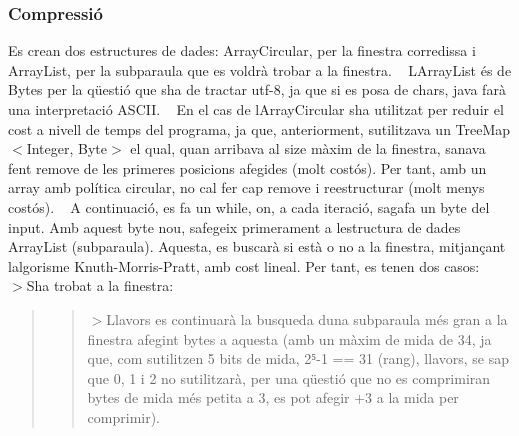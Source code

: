 \subsubsection*{Compressió}

Es crean dos estructures de dades\+: Array\+Circular, per la finestra corredissa i Array\+List, per la subparaula que es voldrà trobar a la finestra. ~\newline
 L\textquotesingle{}Array\+List és de Bytes per la qüestió que s\textquotesingle{}ha de tractar utf-\/8, ja que si es posa de char\textquotesingle{}s, java farà una interpretació A\+S\+C\+II. ~\newline
 En el cas de l\textquotesingle{}Array\+Circular s\textquotesingle{}ha utilitzat per reduir el cost a nivell de temps del programa, ja que, anteriorment, s\textquotesingle{}utilitzava un Tree\+Map$<$Integer, Byte$>$ el qual, quan arribava al size màxim de la finestra, s\textquotesingle{}anava fent remove de les primeres posicions afegides (molt costós). Per tant, amb un array amb política circular, no cal fer cap remove i reestructurar (molt menys costós). ~\newline
 A continuació, es fa un while, on, a cada iteració, s\textquotesingle{}agafa un byte del input. Amb aquest byte nou, s\textquotesingle{}afegeix primerament a l\textquotesingle{}estructura de dades Array\+List (subparaula). Aquesta, es buscarà si està o no a la finestra, mitjançant l\textquotesingle{}algorisme Knuth-\/\+Morris-\/\+Pratt, amb cost lineal. Per tant, es tenen dos casos\+: ~\newline
 $>$S\textquotesingle{}ha trobat a la finestra\+: ~\newline
 \begin{quote}


\begin{quote}
$>$Llavors es continuarà la busqueda d\textquotesingle{}una subparaula més gran a la finestra afegint bytes a aquesta (amb un màxim de mida de 34, ja que, com s\textquotesingle{}utilitzen 5 bits de mida, 2⁵-\/1 == 31 (rang), llavors, se sap que 0, 1 i 2 no s\textquotesingle{}utilitzarà, per una qüestió que no es comprimiran bytes de mida més petita a 3, es pot afegir +3 a la mida per comprimir). ~\newline
 \end{quote}
\end{quote}


